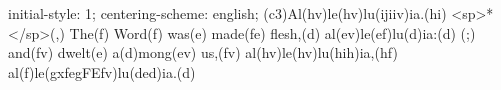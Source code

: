initial-style: 1;
centering-scheme: english;
(c3)Al(hv)le(hv)lu(ijiiv)ia.(hi) <sp>*</sp>(,) The(f) Word(f) was(e) made(fe) flesh,(d) al(ev)le(ef)lu(d)ia:(d) (;) and(fv) dwelt(e) a(d)mong(ev) us,(fv) al(hv)le(hv)lu(hih)ia,(hf) al(f)le(gxfegFEfv)lu(ded)ia.(d)
